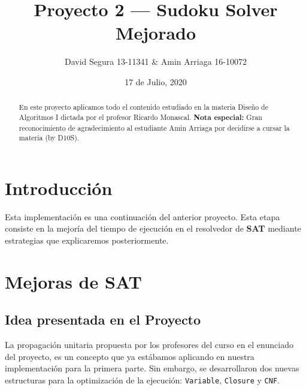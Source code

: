 \documentclass[letterpaper,12pt]{article}
\begin{document}
\title{Proyecto 2 --- Sudoku Solver Mejorado}
\author{David Segura 13-11341 \& Amin Arriaga 16-10072}
\date{17 de Julio, 2020}
\maketitle

\begin{abstract}
En este proyecto aplicamos todo el contenido estudiado en la materia Diseño de Algoritmos I dictada por el profesor Ricardo Monascal. \textbf{Nota especial:} Gran reconocimiento de agradecimiento al estudiante Amin Arriaga por decidirse a cursar la materia (by D10S).
\end{abstract}


\section{Introducción}

Esta implementación es una continuación del anterior proyecto. Esta etapa consiste en la mejoría del tiempo de ejecución en el resolvedor de \textbf{SAT} mediante estrategias que explicaremos posteriormente.

\section{Mejoras de SAT}

\subsection{Idea presentada en el Proyecto}

La propagación unitaria propuesta por los profesores del curso en el enunciado del proyecto, es un concepto que ya estábamos aplicando en nuestra implementación para la primera parte. Sin embargo, se desarrollaron dos nuevas estructuras para la optimización de la ejecución: \texttt{Variable}, \texttt{Closure} y \texttt{CNF}.
\end{document}
